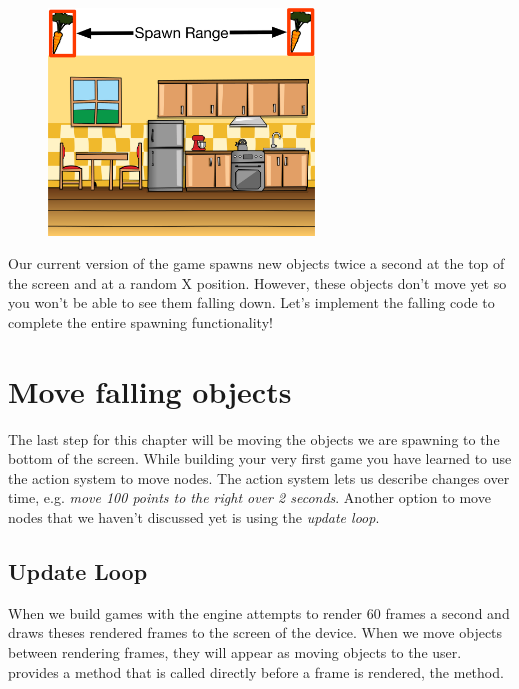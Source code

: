 \begin{figure}[H]
		\centering
		\includegraphics[width=200pt]{images/Chapter2/SpawnObjects.png}
\end{figure}

Our current version of the game spawns new objects twice a second at the top of
the screen and at a random X position. However, these objects don't move yet so
you won't be able to see them falling down. Let's implement the falling code to
complete the entire spawning functionality!

\section{Move falling objects}
The last step for this chapter will be moving the objects we are spawning to the
bottom of the screen. While building your very first \SB{} game you have learned
to use the \cocos{} action system to move nodes. The action system lets us
describe changes over time, e.g. \textit{move 100 points to the right over 2
seconds}. Another option to move nodes that we haven't
discussed yet is using the \cocos{} \textit{update loop}.

\subsection{Update Loop}
When we build games with \cocos{} the engine attempts to render 60 frames a
second and draws theses rendered frames to the screen of the device. When we
move objects between rendering frames, they will appear as moving objects to the
user. \cocos{} provides a method that is called directly before a frame is
rendered, the  method.

